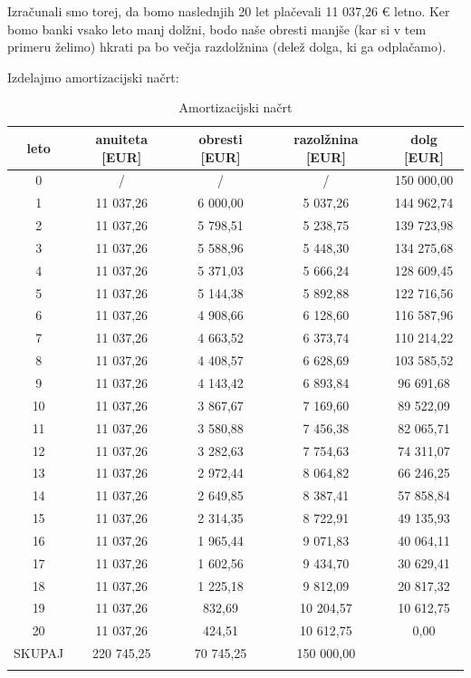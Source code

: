 \documentclass[12pt]{article}
\begin{document}
    Izračunali smo torej, da bomo naslednjih 20 let plačevali 11 037,26 € letno. Ker bomo
    banki vsako leto manj dolžni, bodo naše obresti manjše (kar si v tem primeru želimo)
    hkrati pa bo večja razdolžnina (delež dolga, ki ga odplačamo). 
    
    Izdelajmo amortizacijski načrt:
    \begin{longtable}{|c|c|c|c|c|}
        \hline
        \textbf{leto}   & \textbf{anuiteta [EUR]}  & \textbf{obresti [EUR]}  & \textbf{razolžnina [EUR]} & \textbf{dolg [EUR]} \\ \hline
        \endfirsthead
        \endhead
        0      & /          & /         & /          & 150 000,00 \\ \hline
        1      & 11 037,26  & 6 000,00  & 5 037,26   & 144 962,74 \\ \hline
        2      & 11 037,26  & 5 798,51  & 5 238,75   & 139 723,98 \\ \hline
        3      & 11 037,26  & 5 588,96  & 5 448,30   & 134 275,68 \\ \hline
        4      & 11 037,26  & 5 371,03  & 5 666,24   & 128 609,45 \\ \hline
        5      & 11 037,26  & 5 144,38  & 5 892,88   & 122 716,56 \\ \hline \hline 
        6      & 11 037,26  & 4 908,66  & 6 128,60   & 116 587,96 \\ \hline
        7      & 11 037,26  & 4 663,52  & 6 373,74   & 110 214,22 \\ \hline
        8      & 11 037,26  & 4 408,57  & 6 628,69   & 103 585,52 \\ \hline
        9      & 11 037,26  & 4 143,42  & 6 893,84   & 96 691,68  \\ \hline 
        10     & 11 037,26  & 3 867,67  & 7 169,60   & 89 522,09  \\ \hline \hline
        11     & 11 037,26  & 3 580,88  & 7 456,38   & 82 065,71  \\ \hline
        12     & 11 037,26  & 3 282,63  & 7 754,63   & 74 311,07  \\ \hline
        13     & 11 037,26  & 2 972,44  & 8 064,82   & 66 246,25  \\ \hline
        14     & 11 037,26  & 2 649,85  & 8 387,41   & 57 858,84  \\ \hline
        15     & 11 037,26  & 2 314,35  & 8 722,91   & 49 135,93  \\ \hline \hline
        16     & 11 037,26  & 1 965,44  & 9 071,83   & 40 064,11  \\ \hline
        17     & 11 037,26  & 1 602,56  & 9 434,70   & 30 629,41  \\ \hline
        18     & 11 037,26  & 1 225,18  & 9 812,09   & 20 817,32  \\ \hline
        19     & 11 037,26  & 832,69    & 10 204,57  & 10 612,75  \\ \hline
        20     & 11 037,26  & 424,51    & 10 612,75  & 0,00       \\ \hline \hline
        SKUPAJ & 220 745,25 & 70 745,25 & 150 000,00 &            \\ \hline
        \caption{Amortizacijski načrt}
    \end{longtable}
\end{document}

